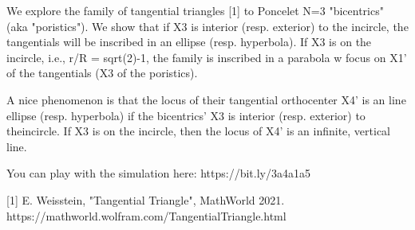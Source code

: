We explore the family of tangential triangles [1] to Poncelet N=3 "bicentrics" (aka "poristics"). We show that if X3 is interior (resp. exterior) to the incircle, the tangentials will be inscribed in an ellipse (resp. hyperbola). If X3 is on the incircle, i.e., r/R = sqrt(2)-1, the family is inscribed in a parabola w focus on X1' of the tangentials (X3 of the poristics).

A nice phenomenon is that the locus of their tangential orthocenter X4'  is an line ellipse (resp. hyperbola) if the bicentrics' X3 is interior (resp. exterior) to theincircle. If X3 is on the incircle, then the locus of X4' is an infinite, vertical line. 

You can play with the simulation here: https://bit.ly/3a4a1a5

[1] E. Weisstein, "Tangential Triangle", MathWorld 2021. https://mathworld.wolfram.com/TangentialTriangle.html